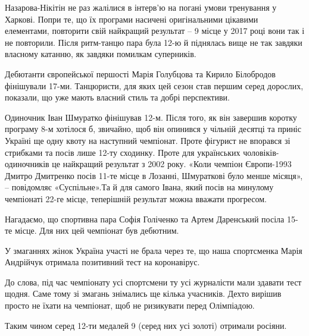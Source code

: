 Назарова-Нікітін не раз жалілися в інтерв’ю на погані умови тренування у
Харкові. Попри те, що їх програми насичені оригінальними цікавими елементами,
повторити свій найкращий результат – 9 місце у 2017 році вони так і не
повторили. Після ритм-танцю пара була 12-ю й піднялась вище не так завдяки
власному катанню, як завдяки помилкам суперників.

Дебютанти європейської першості Марія Голубцова та Кирило Білобродов фінішували
17-ми. Танцюристи, для яких цей сезон став першим серед дорослих, показали, що
уже мають власний стиль та добрі перспективи.

Одиночник Іван Шмуратко фінішував 12-м. Після того, як він завершив коротку
програму 8-м хотілося б, звичайно, щоб він опинився у чільній десятці та приніс
Україні ще одну квоту на наступний чемпіонат. Проте фігурист не впорався зі
стрибками та посів лише 12-ту сходинку. Проте для українських
чоловіків-одиночників це найкращий результат з 2002 року. «Коли чемпіон
Європи-1993 Дмитро Дмитренко посів 11-те місце в Лозанні, Шмураткові було менше
місяця», – повідомляє «Суспільне».Та й для самого Івана, який посів на минулому
чемпіонаті 22-ге місце, теперішній результат можна вважати прогресом.

Нагадаємо, що спортивна пара Софія Голіченко та Артем Даренський посіла 15-те
місце. Для них цей чемпіонат був дебютним.

У змаганнях жінок Україна участі не брала через те, що наша спортсменка Марія
Андрійчук отримала позитивний тест на коронавірус.

До слова, під час чемпіонату усі спортсмени ту усі журналісти мали здавати тест
щодня. Саме тому зі змагань знімались ще кілька учасників. Дехто вирішив просто
не їхати на чемпіонат, щоб не ризикувати перед Олімпіадою.

Таким чином серед 12-ти медалей 9 (серед них усі золоті) отримали росіяни.

